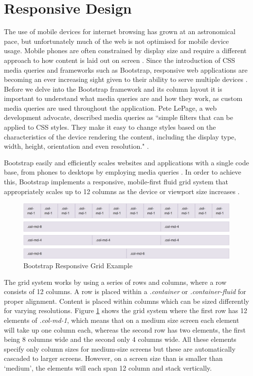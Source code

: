 \section{Responsive Design}
The use of mobile devices for internet browsing has grown at an astronomical pace, but unfortunately much of the web is not optimised for mobile device usage. Mobile phones are often constrained by display size and require a different approach to how content is laid out on screen \cite{GoogleDev:Responsiveness}. Since the introduction of CSS media queries and frameworks such as Bootstrap, responsive web applications are becoming an ever increasing sight given to their ability to serve multiple devices \cite{Bootstrap:Home}. Before we delve into the Bootstrap framework and its column layout it is important to understand what media queries are and how they work, as custom media queries are used throughout the application. Pete LePage, a web development advocate, described media queries as ``simple filters that can be applied to CSS styles. They make it easy to change styles based on the characteristics of the device rendering the content, including the display type, width, height, orientation and even resolution." \cite{GoogleDev:Responsiveness}.

Bootstrap easily and efficiently scales websites and applications with a single code base, from phones to desktops by employing media queries \cite{Bootstrap:Home}. In order to achieve this, Bootstrap implements a responsive, mobile-first fluid grid system that appropriately scales up to 12 columns as the device or viewport size increases \cite{Bootstrap:Grid}.

\begin{figure}[H]
\centering
\includegraphics[width=1.0\textwidth]{Images/Implementation/BootstrapGrid}
\caption{Bootstrap Responsive Grid Example} 
\label{fig:BootstrapGrid}
\end{figure}

The grid system works by using a series of rows and columns, where a row consists of 12 columns. A row is placed within a \emph{.container} or \emph{.container-fluid} for proper alignment. Content is placed within columns which can be sized differently for varying resolutions. Figure \ref{fig:BootstrapGrid} shows the grid system where the first row has 12 elements of \emph{.col-md-1}, which means that on a medium size screen each element will take up one column each, whereas the second row has two elements, the first being 8 columns wide and the second only 4 columns wide. All these elements specify only column sizes for medium-size screens but these are automatically cascaded to larger screens. However, on a screen size than is smaller than `medium', the elements will each span 12 column and stack vertically. 

